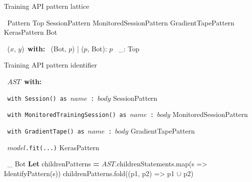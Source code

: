 
\begin{algorithm}
  \caption{Training API pattern lattice}
  \begin{algorithmic}[1]
    \Enum~Pattern
    \State Top
    \State SessionPattern 
    \State MonitoredSessionPattern
    \State GradientTapePattern
    \State KerasPattern
    \State Bot
    \EndEnum
    
     
    \Match~($x$, $y$)~\textbf{with:}
      \Case~(Bot, $p$) | ($p$, Bot): $p$ \EndCase
      \Case~\_: Top \EndCase

    \EndMatch 
    \EndFunction
  \end{algorithmic}
\end{algorithm}

\begin{algorithm}
  \caption{Training API pattern identifier}\label{tapa}
  \begin{algorithmic}[1]
    \Match~$AST$~\textbf{with:}

      \Case~{\tt with Session() as}~$name$~{\tt :}~$body$
          SessionPattern
        \EndIf
      \EndCase

      \Case~{\tt with MonitoredTrainingSession() as}~$name$~{\tt :}~$body$
          MonitoredSessionPattern
        \EndIf
      \EndCase

      \Case~{\tt with GradientTape() as}~$name$~{\tt :}~$body$
          GradientTapePattern
        \EndIf
      \EndCase

      \Case~$model${\tt.fit(...)}
          KerasPattern
        \EndIf
      \EndCase

      \Case~\_
          Bot 
        \Else
          \State \textbf{Let} childrenPatterns \textbf{=} $AST$.childrenStatements.map(s => IdentifyPattern(s))
          \State childrenPatterns.fold((p1, p2) => p1 $\cup$ p2) 
        \EndIf
      \EndCase

    \EndMatch
    \EndFunction
  \end{algorithmic}
\end{algorithm}
